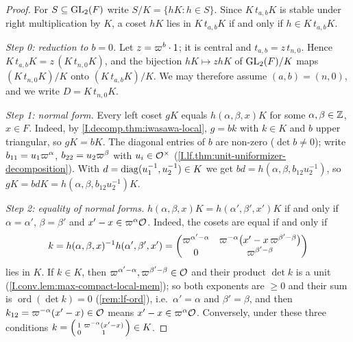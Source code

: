 \begin{theorem}
\end{theorem}
\begin{proof}
For $S\subseteq\mathrm{GL}_2(F)$ write $S/K=\{hK:h\in S\}$. Since $K\,t_{a,b}K$ is stable under right multiplication by $K$,
a coset $hK$ lies in $K\,t_{a,b}K$ if and only if $h\in K\,t_{a,b}K$.

\emph{Step 0: reduction to $b=0$.} Let $z=\varpi^b\cdot1$; it is central and $t_{a,b}=z\,t_{n,0}$. Hence
$K\,t_{a,b}K=z\,(K\,t_{n,0}K)$, and the bijection $hK\mapsto zhK$ of $\mathrm{GL}_2(F)/K$ maps $(K\,t_{n,0}K)/K$ onto
$(K\,t_{a,b}K)/K$. We may therefore assume $(a,b)=(n,0)$, and we write $D=K\,t_{n,0}K$.

\emph{Step 1: normal form.} Every left coset $gK$ equals $h(\alpha,\beta,x)K$ for some $\alpha,\beta\in\mathbb{Z}$, $x\in F$.
Indeed, by \cref{I.decomp.thm:iwasawa-local}, $g=bk$ with $k\in K$ and $b$ upper triangular, so $gK=bK$. The diagonal
entries of $b$ are non-zero ($\det b\neq0$); write $b_{11}=u_1\varpi^\alpha$, $b_{22}=u_2\varpi^\beta$ with
$u_i\in\mathcal{O}^\times$ (\cref{I.lf.thm:unit-uniformizer-decomposition}). With $d=\operatorname{diag}(u_1^{-1},u_2^{-1})\in K$ we get
$bd=h(\alpha,\beta,b_{12}u_2^{-1})$, so $gK=bdK=h(\alpha,\beta,b_{12}u_2^{-1})K$.

\emph{Step 2: equality of normal forms.} $h(\alpha,\beta,x)K=h(\alpha',\beta',x')K$ if and only if $\alpha=\alpha'$,
$\beta=\beta'$ and $x'-x\in\varpi^\alpha\mathcal{O}$. Indeed, the cosets are equal if and only if
\[
  k=h(\alpha,\beta,x)^{-1}h(\alpha',\beta',x')
   =\begin{pmatrix}\varpi^{\alpha'-\alpha}&\varpi^{-\alpha}\bigl(x'-x\,\varpi^{\beta'-\beta}\bigr)\\0&\varpi^{\beta'-\beta}\end{pmatrix}
\]
lies in $K$. If $k\in K$, then $\varpi^{\alpha'-\alpha},\varpi^{\beta'-\beta}\in\mathcal{O}$ and their product $\det k$ is a
unit (\cref{I.conv.lem:max-compact-local-mem}); so both exponents are $\ge0$ and their sum is
$\operatorname{ord}(\det k)=0$ (\cref{rem:lf-ord}), i.e.\ $\alpha'=\alpha$ and $\beta'=\beta$, and then
$k_{12}=\varpi^{-\alpha}(x'-x)\in\mathcal{O}$ means $x'-x\in\varpi^\alpha\mathcal{O}$. Conversely, under these three conditions
$k=\begin{psmallmatrix}1&\varpi^{-\alpha}(x'-x)\\0&1\end{psmallmatrix}\in K$.


\end{proof}

